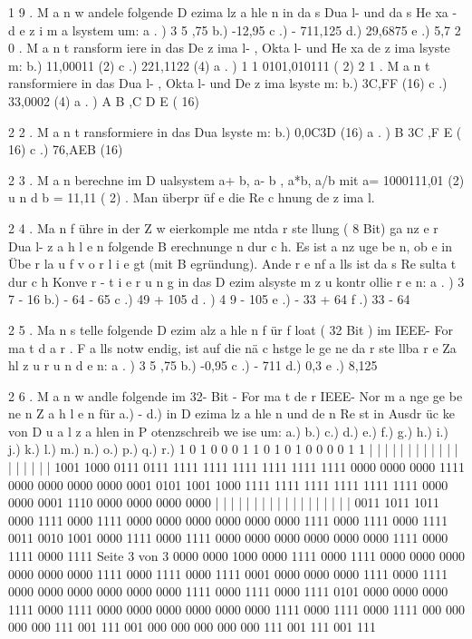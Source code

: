 1 9 . M a n w andele folgende D ezima lz a hle n in da s Dua l- und da s He xa -
d e z i m a lsystem um:
a . ) 3 5 ,75
b.) -12,95
c .) - 711,125
d.) 29,6875
e .) 5,7
2 0 . M a n t ransform iere in das De z ima l- , Okta l- und He xa de z ima lsyste m:
b.) 11,00011 (2)
c .) 221,1122 (4)
a . ) 1 1 0101,010111 ( 2)
2 1 . M a n t ransformiere in das Dua l- , Okta l- und De z ima lsyste m:
b.) 3C,FF (16)
c .) 33,0002 (4)
a . ) A B ,C D E ( 16)

2 2 . M a n t ransformiere in das Dua lsyste m:
b.) 0,0C3D (16)
a . ) B 3C ,F E ( 16)
c .) 76,AEB (16)

2 3 . M a n berechne im D ualsystem a+ b, a- b , a*b, a/b mit a= 1000111,01 (2)
u n d b = 11,11 ( 2) . Man überpr üf e die Re c hnung de z ima l.

2 4 . Ma n f ühre in der Z w eierkomple me ntda r ste llung ( 8 Bit) ga nz e r Dua l-
z a h l e n folgende B erechnunge n dur c h. Es ist a nz uge be n, ob e in Übe r la u f
v o r l i e gt (mit B egründung). Ande r e nf a lls ist da s Re sulta t dur c h Konve r -
t i e r u n g in das D ezim alsyste m z u kontr ollie r e n:
a . ) 3 7 - 16
b.) - 64 - 65
c .) 49 + 105
d . ) 4 9 - 105
e .) - 33 + 64
f .) 33 - 64

2 5 . Ma n s telle folgende D ezim alz a hle n f ür f loat ( 32 Bit ) im IEEE- For ma t
d a r . F a lls notw endig, ist auf die nä c hstge le ge ne da r ste llba r e Za hl z u
r u n d e n:
a . ) 3 5 ,75
b.) -0,95
c .) - 711
d.) 0,3 e .) 8,125

2 6 . M a n w andle folgende im 32- Bit - For ma t de r IEEE- Nor m a nge ge be ne n
Z a h l e n für a.) - d.) in D ezima lz a hle n und de n Re st in Ausdr üc ke von
D u a l z a hlen in P otenzschreib we ise um:
a.)
b.)
c.)
d.)
e.)
f.)
g.)
h.)
i.)
j.)
k.)
l.)
m.)
n.)
o.)
p.)
q.)
r.)
1
0
1
0
0
0
1
1
0
1
0
1
0
0
0
0
1
1
|
|
|
|
|
|
|
|
|
|
|
|
|
|
|
|
|
|
1001
1000
0111
0111
1111
1111
1111
1111
1111
1111
0000
0000
0000
1111
0000
0000
0000
0000
0001
0101
1001
1000
1111
1111
1111
1111
1111
1111
0000
0000
0001
1110
0000
0000
0000
0000
|
|
|
|
|
|
|
|
|
|
|
|
|
|
|
|
|
|
0011
1011
1011
0000
1111
0000
1111
0000
0000
0000
0000
0000
0000
1111
0000
1111
0000
1111
0011
0010
1001
0000
1111
0000
1111
0000
0000
0000
0000
0000
0000
1111
0000
1111
0000
1111
Seite 3 von 3
0000
0000
1000
0000
1111
0000
1111
0000
0000
0000
0000
0000
0000
1111
0000
1111
0000
1111
0001
0000
0000
0000
1111
0000
1111
0000
0000
0000
0000
0000
0000
1111
0000
1111
0000
1111
0101
0000
0000
0000
1111
0000
1111
0000
0000
0000
0000
0000
0000
1111
0000
1111
0000
1111
000
000
000
000
111
001
111
001
000
000
000
000
000
111
001
111
001
111

